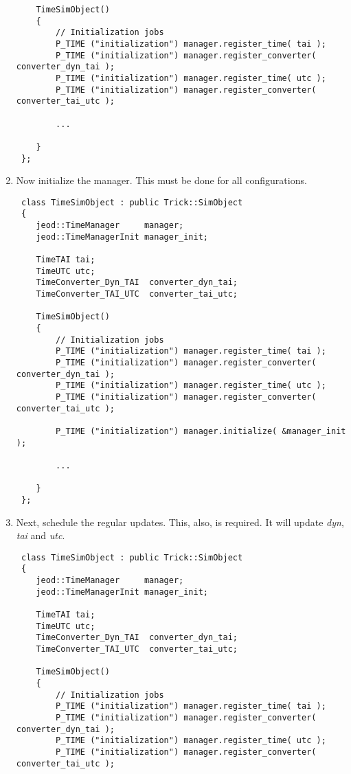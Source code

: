 \begin{enumerate}
\begin{verbatim}
    TimeSimObject()
    {
        // Initialization jobs
        P_TIME ("initialization") manager.register_time( tai );
        P_TIME ("initialization") manager.register_converter( converter_dyn_tai );
        P_TIME ("initialization") manager.register_time( utc );
        P_TIME ("initialization") manager.register_converter( converter_tai_utc );

        ...

    }
 };
\end{verbatim}

\item Now initialize the manager.  This must be done for all configurations.

\begin{verbatim}
 class TimeSimObject : public Trick::SimObject
 {
    jeod::TimeManager     manager;
    jeod::TimeManagerInit manager_init;

    TimeTAI tai;
    TimeUTC utc;
    TimeConverter_Dyn_TAI  converter_dyn_tai;
    TimeConverter_TAI_UTC  converter_tai_utc;

    TimeSimObject()
    {
        // Initialization jobs
        P_TIME ("initialization") manager.register_time( tai );
        P_TIME ("initialization") manager.register_converter( converter_dyn_tai );
        P_TIME ("initialization") manager.register_time( utc );
        P_TIME ("initialization") manager.register_converter( converter_tai_utc );

        P_TIME ("initialization") manager.initialize( &manager_init );

        ...

    }
 };
\end{verbatim}

\item Next, schedule the regular updates.  This, also,  is required.  It will
update \textit{dyn}, \textit{tai} and \textit{utc}.

\begin{verbatim}
 class TimeSimObject : public Trick::SimObject
 {
    jeod::TimeManager     manager;
    jeod::TimeManagerInit manager_init;

    TimeTAI tai;
    TimeUTC utc;
    TimeConverter_Dyn_TAI  converter_dyn_tai;
    TimeConverter_TAI_UTC  converter_tai_utc;

    TimeSimObject()
    {
        // Initialization jobs
        P_TIME ("initialization") manager.register_time( tai );
        P_TIME ("initialization") manager.register_converter( converter_dyn_tai );
        P_TIME ("initialization") manager.register_time( utc );
        P_TIME ("initialization") manager.register_converter( converter_tai_utc );


\end{verbatim}
\end{enumerate}
